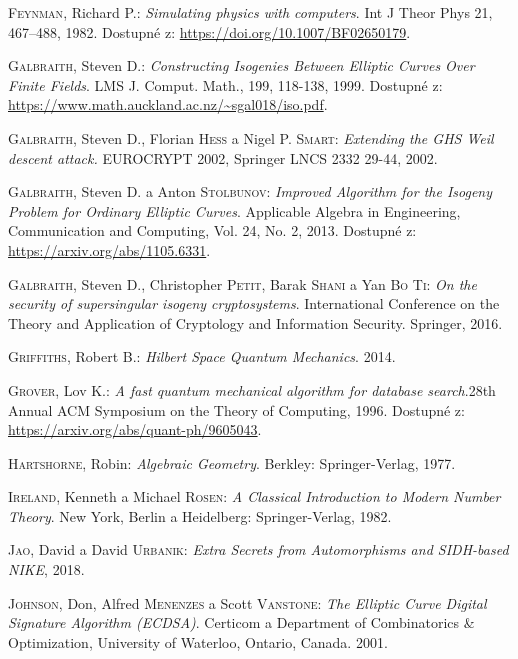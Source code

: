 \documentclass[12pt]{report}
\begin{document}
\begin{thebibliography}{97}
\textsc{Feynman}, Richard P.: \textit{Simulating physics with computers}. Int J Theor Phys 21, 467–488, 1982. Dostupné z: \url{https://doi.org/10.1007/BF02650179}.

\textsc{Galbraith}, Steven D.: \textit{Constructing Isogenies Between Elliptic Curves Over Finite Fields}. LMS J. Comput. Math., 199, 118-138, 1999. Dostupné z: \url{https://www.math.auckland.ac.nz/~sgal018/iso.pdf}.

\textsc{Galbraith}, Steven D., Florian \textsc{Hess} a Nigel P. \textsc{Smart}: \textit{Extending the GHS Weil descent attack.} EUROCRYPT 2002,  Springer LNCS 2332 29-44, 2002.

\textsc{Galbraith}, Steven D. a Anton \textsc{Stolbunov}: \textit{Improved Algorithm for the Isogeny Problem for Ordinary Elliptic Curves}. Applicable Algebra in Engineering, Communication and Computing, Vol. 24, No. 2, 2013. Dostupné z: \url{https://arxiv.org/abs/1105.6331}.

\textsc{Galbraith}, Steven D., Christopher \textsc{Petit}, Barak \textsc{Shani} a Yan \textsc{Bo Ti}: \textit{On the security of supersingular isogeny cryptosystems}. International Conference on the Theory and Application of Cryptology and Information Security. Springer, 2016.

\textsc{Griffiths}, Robert B.: \textit{Hilbert Space Quantum Mechanics}. 2014.

\textsc{Grover}, Lov K.: \textit{A fast quantum mechanical algorithm for database search}.28th Annual ACM Symposium on the Theory of Computing, 1996. Dostupné z: \url{https://arxiv.org/abs/quant-ph/9605043}.

\textsc{Hartshorne}, Robin: \textit{Algebraic  Geometry}. Berkley: Springer-Verlag, 1977.

\textsc{Ireland}, Kenneth a Michael \textsc{Rosen}: \textit{A Classical Introduction to Modern Number Theory}. New York, Berlin a Heidelberg: Springer-Verlag, 1982.

\textsc{Jao}, David a David \textsc{Urbanik}: \textit{Extra Secrets from Automorphisms and SIDH-based NIKE}, 2018.

\textsc{Johnson}, Don, Alfred \textsc{Menenzes} a Scott \textsc{Vanstone}: \textit{The Elliptic Curve Digital Signature Algorithm (ECDSA)}. Certicom a Department of Combinatorics \& Optimization, University of Waterloo,  Ontario, Canada. 2001.


\end{thebibliography}
\end{document}
